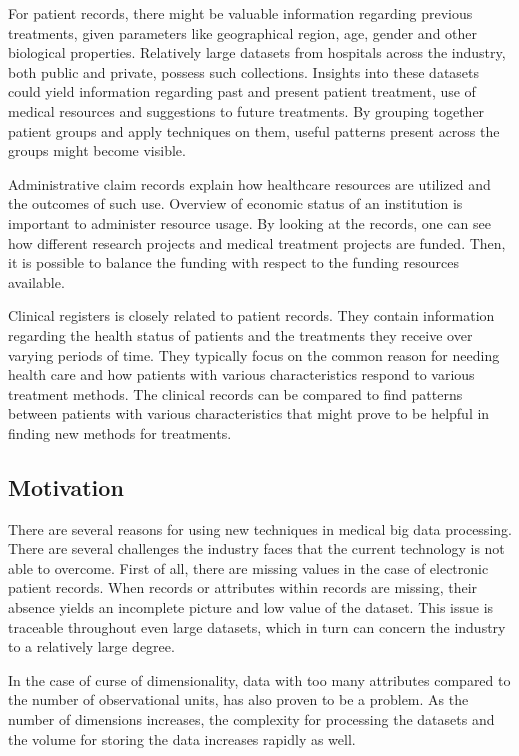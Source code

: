 For patient records, there might be valuable information regarding previous treatments, given parameters like geographical region, age, gender and other biological properties. Relatively large datasets from hospitals across the industry, both public and private, possess such collections. Insights into these datasets could yield information regarding past and present patient treatment, use of medical resources and suggestions to future treatments. By grouping together patient groups and apply techniques on them, useful patterns present across the groups might become visible. 

Administrative claim records explain how healthcare resources are utilized and the outcomes of such use. Overview of economic status of an institution is important to administer resource usage. By looking at the records, one can see how different research projects and medical treatment projects are funded. Then, it is possible to balance the funding with respect to the funding resources available. 

Clinical registers is closely related to patient records.\cite{geir} They contain information regarding the health status of patients and the treatments they receive over varying periods of time. They typically focus on the common reason for needing health care and how patients with various characteristics respond to various treatment methods. 
The clinical records can be compared to find patterns between patients with various characteristics that might prove to be helpful in finding new methods for treatments.



\subsection{Motivation}
There are several reasons for using new techniques in medical big data processing. There are several challenges the industry faces that the current technology is not able to overcome. First of all, there are missing values in the case of electronic patient records\cite{wp}. When records or attributes within records are missing, their absence yields an incomplete picture and low value of the dataset. This issue is traceable throughout even large datasets, which in turn can concern the industry to a relatively large degree. 

In the case of curse of dimensionality, data with too many attributes compared to the number of observational units, has also proven to be a problem. As the number of dimensions increases, the complexity for processing the datasets and the volume for storing the data increases rapidly as well. 

